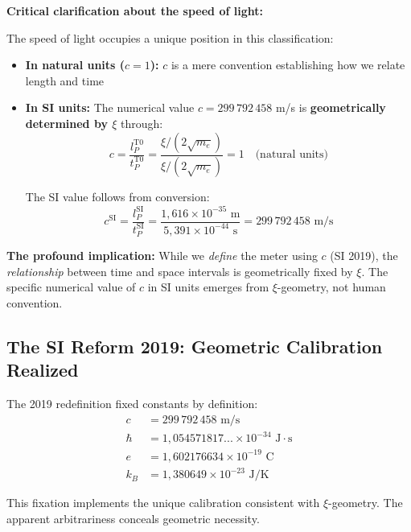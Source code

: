	\begin{warning}
		\textbf{Critical clarification about the speed of light:}
		
		The speed of light occupies a unique position in this classification:
		
		\begin{itemize}
			\item \textbf{In natural units ($c = 1$):} $c$ is a mere convention establishing how we relate length and time
			
			\item \textbf{In SI units:} The numerical value $c = 299\,792\,458$ m/s is \textbf{geometrically determined by $\xi$} through:
			\begin{equation}
				c = \frac{l_P^{\text{T0}}}{t_P^{\text{T0}}} = \frac{\xi/(2\sqrt{m_e})}{\xi/(2\sqrt{m_e})} = 1 \quad \text{(natural units)}
			\end{equation}
			
			The SI value follows from conversion:
			\begin{equation}
				c^{\text{SI}} = \frac{l_P^{\text{SI}}}{t_P^{\text{SI}}} = \frac{1{,}616 \times 10^{-35} \text{ m}}{5{,}391 \times 10^{-44} \text{ s}} = 299\,792\,458 \text{ m/s}
			\end{equation}
		\end{itemize}
		
		\textbf{The profound implication:} While we \emph{define} the meter using $c$ (SI 2019), the \emph{relationship} between time and space intervals is geometrically fixed by $\xi$. The specific numerical value of $c$ in SI units emerges from $\xi$-geometry, not human convention.
	\end{warning}
	
	\subsection{The SI Reform 2019: Geometric Calibration Realized}
	
	The 2019 redefinition fixed constants by definition:
	\begin{align}
		c &= 299\,792\,458 \text{ m/s} \\
		\hbar &= 1{,}054571817... \times 10^{-34} \text{ J}\cdot\text{s} \\
		e &= 1{,}602176634 \times 10^{-19} \text{ C} \\
		k_B &= 1{,}380649 \times 10^{-23} \text{ J/K}
	\end{align}
	
	\begin{insight}
		This fixation implements the unique calibration consistent with $\xi$-geometry. The apparent arbitrariness conceals geometric necessity.
	\end{insight}
	
